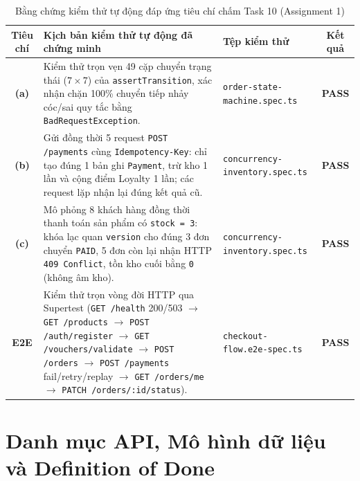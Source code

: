 \documentclass[a4paper,12pt]{article}
\begin{document}
\begin{table}[h!]
\centering
\scriptsize
\begin{tabularx}{\textwidth}{|c|X|l|c|}
\hline
\textbf{Tiêu chí} & \textbf{Kịch bản kiểm thử tự động đã chứng minh} & \textbf{Tệp kiểm thử} & \textbf{Kết quả} \\
\hline
\textbf{(a)} & Kiểm thử trọn vẹn 49 cặp chuyển trạng thái ($7 \times 7$) của \texttt{assertTransition}, xác nhận chặn 100\% chuyển tiếp nhảy cóc/sai quy tắc bằng \texttt{BadRequestException}. & \texttt{order-state-machine.spec.ts} & \textbf{PASS} \\
\hline
\textbf{(b)} & Gửi đồng thời 5 request \texttt{POST /payments} cùng \texttt{Idempotency-Key}: chỉ tạo đúng 1 bản ghi \texttt{Payment}, trừ kho 1 lần và cộng điểm Loyalty 1 lần; các request lặp nhận lại đúng kết quả cũ. & \texttt{concurrency-inventory.spec.ts} & \textbf{PASS} \\
\hline
\textbf{(c)} & Mô phỏng 8 khách hàng đồng thời thanh toán sản phẩm có \texttt{stock = 3}: khóa lạc quan \texttt{version} cho đúng 3 đơn chuyển \texttt{PAID}, 5 đơn còn lại nhận HTTP \texttt{409 Conflict}, tồn kho cuối bằng \texttt{0} (không âm kho). & \texttt{concurrency-inventory.spec.ts} & \textbf{PASS} \\
\hline
\textbf{E2E} & Kiểm thử trọn vòng đời HTTP qua Supertest (\texttt{GET /health} 200/503 $\rightarrow$ \texttt{GET /products} $\rightarrow$ \texttt{POST /auth/register} $\rightarrow$ \texttt{GET /vouchers/validate} $\rightarrow$ \texttt{POST /orders} $\rightarrow$ \texttt{POST /payments} fail/retry/replay $\rightarrow$ \texttt{GET /orders/me} $\rightarrow$ \texttt{PATCH /orders/:id/status}). & \texttt{checkout-flow.e2e-spec.ts} & \textbf{PASS} \\
\hline
\end{tabularx}
\caption{Bằng chứng kiểm thử tự động đáp ứng tiêu chí chấm Task 10 (Assignment 1)}
\end{table}

\newpage
\section{Danh mục API, Mô hình dữ liệu và Definition of Done}
\end{document}

